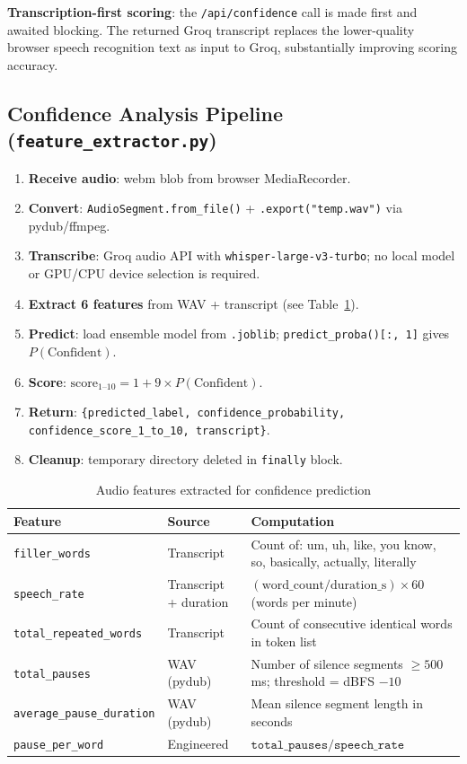 \documentclass[12pt,a4paper]{article}
\begin{document}
\textbf{Transcription-first scoring}: the \texttt{/api/confidence} call is made first and awaited blocking. The returned Groq transcript replaces the lower-quality browser speech recognition text as input to Groq, substantially improving scoring accuracy.

\subsection{Confidence Analysis Pipeline (\texttt{feature\_extractor.py})}

\begin{enumerate}[leftmargin=2em]
  \item \textbf{Receive audio}: webm blob from browser MediaRecorder.
  \item \textbf{Convert}: \texttt{AudioSegment.from\_file()} + \texttt{.export("temp.wav")} via pydub/ffmpeg.
  \item \textbf{Transcribe}: Groq audio API with \texttt{whisper-large-v3-turbo}; no local model or GPU/CPU device selection is required.
  \item \textbf{Extract 6 features} from WAV + transcript (see Table~\ref{tab:features}).
  \item \textbf{Predict}: load ensemble model from \texttt{.joblib}; \texttt{predict\_proba()[:, 1]} gives $P(\text{Confident})$.
  \item \textbf{Score}: $\text{score}_{1\text{--}10} = 1 + 9 \times P(\text{Confident})$.
  \item \textbf{Return}: \texttt{\{predicted\_label, confidence\_probability, confidence\_score\_1\_to\_10, transcript\}}.
  \item \textbf{Cleanup}: temporary directory deleted in \texttt{finally} block.
\end{enumerate}

\begin{table}[H]
\centering
\caption{Audio features extracted for confidence prediction}
\label{tab:features}
\small
\begin{tabularx}{\textwidth}{l l X}
\toprule
\textbf{Feature} & \textbf{Source} & \textbf{Computation} \\
\midrule
\texttt{filler\_words} & Transcript & Count of: um, uh, like, you know, so, basically, actually, literally \\
\texttt{speech\_rate} & Transcript + duration & $(\text{word\_count} / \text{duration\_s}) \times 60$ (words per minute) \\
\texttt{total\_repeated\_words} & Transcript & Count of consecutive identical words in token list \\
\texttt{total\_pauses} & WAV (pydub) & Number of silence segments $\geq 500$ ms; threshold = dBFS $-10$ \\
\texttt{average\_pause\_duration} & WAV (pydub) & Mean silence segment length in seconds \\
\texttt{pause\_per\_word} & Engineered & $\texttt{total\_pauses} / \texttt{speech\_rate}$ \\
\bottomrule
\end{tabularx}
\end{table}
\end{document}
